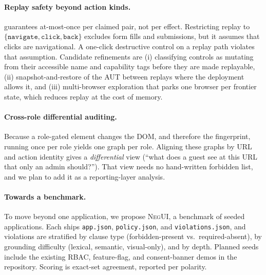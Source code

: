 \paragraph{Replay safety beyond action kinds.}
 guarantees at-most-once per claimed pair, not per effect.
Restricting replay to $\{\texttt{navigate},\texttt{click},\texttt{back}\}$
excludes form fills and submissions, but it assumes that clicks are
navigational. A one-click destructive control on a replay path violates that
assumption. Candidate refinements are (i) classifying controls as mutating
from their accessible name and capability tags before they are made
replayable, (ii) snapshot-and-restore of the AUT between replays where the
deployment allows it, and (iii) multi-browser exploration that parks one
browser per frontier state, which reduces replay at the cost of memory.

\paragraph{Cross-role differential auditing.}
Because a role-gated element changes the DOM, and therefore the fingerprint,
running \sys{} once per role yields one graph per role. Aligning these graphs
by URL and action identity gives a \emph{differential} view (``what does a
guest see at this URL that only an admin should?''). That view needs no
hand-written forbidden list, and we plan to add it as a reporting-layer
analysis.

\paragraph{Towards a benchmark.}
To move beyond one application, we propose \textsc{NegUI}, a benchmark of
seeded applications. Each ships \texttt{app.json}, \texttt{policy.json}, and
\texttt{violations.json}, and violations are stratified by clause type
(forbidden-present vs.\ required-absent), by grounding difficulty (lexical,
semantic, visual-only), and by depth. Planned seeds include the existing
RBAC, feature-flag, and consent-banner demos in the repository. Scoring is
exact-set agreement, reported per polarity.
